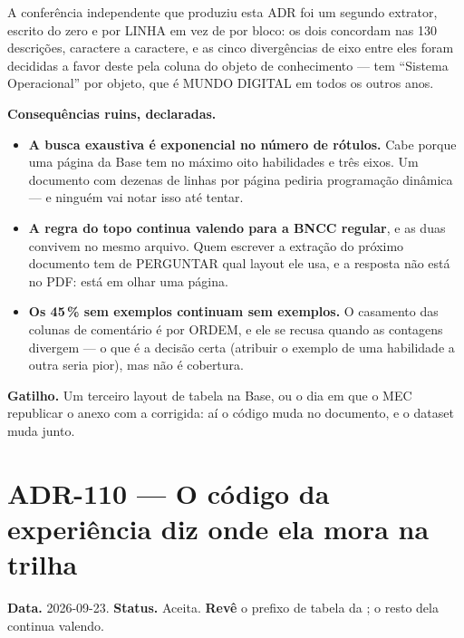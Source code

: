 A conferência independente que produziu esta ADR foi um segundo extrator,
escrito do zero e por LINHA em vez de por bloco: os dois concordam nas 130
descrições, caractere a caractere, e as cinco divergências de eixo entre eles
foram decididas a favor deste pela coluna do objeto de conhecimento ---
 tem \enquote{Sistema Operacional} por objeto, que é MUNDO DIGITAL
em todos os outros anos.

\textbf{Consequências ruins, declaradas.}

\begin{itemize}
  \item \textbf{A busca exaustiva é exponencial no número de rótulos.} Cabe
    porque uma página da Base tem no máximo oito habilidades e três eixos. Um
    documento com dezenas de linhas por página pediria programação dinâmica ---
    e ninguém vai notar isso até tentar.
  \item \textbf{A regra do topo continua valendo para a BNCC regular}, e as duas
    convivem no mesmo arquivo. Quem escrever a extração do próximo documento tem
    de PERGUNTAR qual layout ele usa, e a resposta não está no PDF: está em
    olhar uma página.
  \item \textbf{Os 45\,\% sem exemplos continuam sem exemplos.} O casamento das
    colunas de comentário é por ORDEM, e ele se recusa quando as contagens
    divergem --- o que é a decisão certa (atribuir o exemplo de uma habilidade a
    outra seria pior), mas não é cobertura.
\end{itemize}

\textbf{Gatilho.} Um terceiro layout de tabela na Base, ou o dia em que o MEC
republicar o anexo com a  corrigida: aí o código muda no
documento, e o dataset muda junto.

\section{ADR-110 --- O código da experiência diz onde ela mora na trilha}
\label{adr:codigo-da-experiencia}

\textbf{Data.} 2026-09-23. \textbf{Status.} Aceita.
\textbf{Revê} o prefixo de tabela da ; o resto dela continua valendo.

